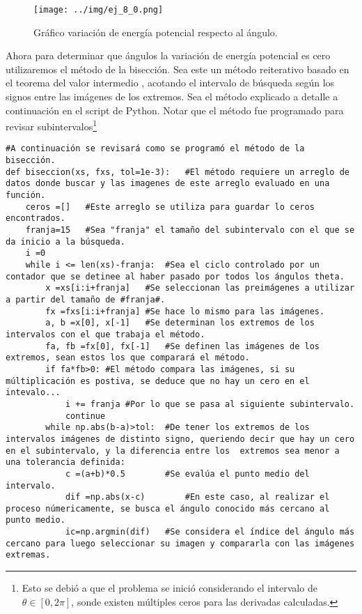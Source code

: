 \documentclass[../portafolio.tex]{subfiles}
\begin{document}
\begin{figure}
\centering
\texttt{[image: ../img/ej\_8\_0.png]}
\caption{Gráfico variación de energía potencial respecto al ángulo.} \label{g5_ej8_graf0}
\end{figure}
Ahora para determinar que ángulos la variación de energía potencial es cero utilizaremos el método de la bisección. Sea este un método reiterativo basado en el teorema del valor intermedio \citep{Stewart2001}, acotando el intervalo de búsqueda según los signos entre las imágenes de los extremos. Sea el método explicado a detalle a continuación en el script de Python. Notar que el método fue programado para revisar subintervalos\footnote{Esto se debió a que el problema se inició considerando el intervalo de $\theta \in [0,2\pi]$, sonde existen múltiples ceros para las derivadas calculadas.}
\begin{verbatim}
#A continuación se revisará como se programó el método de la bisección.
def biseccion(xs, fxs, tol=1e-3):	#El método requiere un arreglo de datos donde buscar y las imagenes de este arreglo evaluado en una función.
    ceros =[]	#Este arreglo se utiliza para guardar lo ceros encontrados.
    franja=15	#Sea "franja" el tamaño del subintervalo con el que se da inicio a la búsqueda.
    i =0
    while i <= len(xs)-franja:	#Sea el ciclo controlado por un contador que se detinee al haber pasado por todos los ángulos theta.
        x =xs[i:i+franja]	#Se seleccionan las preimágenes a utilizar a partir del tamaño de #franja#.
        fx =fxs[i:i+franja]	#Se hace lo mismo para las imágenes.
        a, b =x[0], x[-1]	#Se determinan los extremos de los intervalos con el que trabaja el método.
        fa, fb =fx[0], fx[-1]	#Se definen las imágenes de los extremos, sean estos los que comparará el método.
        if fa*fb>0:	#El método compara las imágenes, si su múltiplicación es postiva, se deduce que no hay un cero en el intevalo...
            i += franja	#Por lo que se pasa al siguiente subintervalo.
            continue
        while np.abs(b-a)>tol: 	#De tener los extremos de los intervalos imágenes de distinto signo, queriendo decir que hay un cero en el subintervalo, y la diferencia entre los  extremos sea menor a una tolerancia definida:
            c =(a+b)*0.5		#Se evalúa el punto medio del intervalo.
            dif =np.abs(x-c)		#En este caso, al realizar el proceso númericamente, se busca el ángulo conocido más cercano al punto medio.
            ic=np.argmin(dif)	#Se considera el índice del ángulo más cercano para luego seleccionar su imagen y compararla con las imágenes extremas.

\end{verbatim}
\end{document}
